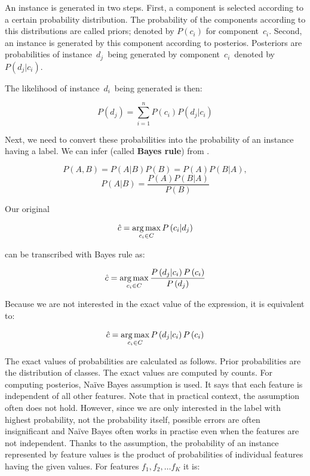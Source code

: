 An instance is generated in two steps.
First, a component is selected according to a certain probability distribution.
The probability of the components according to this distributions are
called priors; denoted by $P\left(c_i\right)$ for component~$c_i$.
Second, an instance is generated by this component according to posterios.
Posteriors are probabilities of instance~$d_j$~being generated by component~$c_i$~denoted by~$P\left(d_j|c_i\right)$.

The likelihood of instance~$d_i$~being generated is then:

\begin{equation}
	P\left(d_j\right) = \sum_{i=1}^{n}{
	P\left(c_i\right)
	P\left(d_j|c_i\right)
}
\end{equation}

Next, we need to convert these probabilities into the probability of an instance having a label.
We can infer  (called \textbf{Bayes rule}) from .

\begin{equation}
	\label{eq:bayesinfer}
	P\left(A,B\right) = 
	P\left(A|B\right)
	P\left(B\right) = 
	P\left(A\right)
	P\left(B|A\right),
\end{equation}
\begin{equation}
	\label{eq:bayesrule}
	P\left(A|B\right) =
	\frac{
	P\left(A\right)
P\left(B|A\right)}
{P\left(B\right)}
\end{equation}

Our original 

\begin{equation}
	\hat{c} = \operatorname*{arg\,max}_{c_i \in C} P\left(c_i  | d_j \right)
\end{equation}

can be transcribed with Bayes rule as:

\begin{equation}
	\hat{c} = \operatorname*{arg\,max}_{c_i \in C}
	\frac{
	P\left(d_j  | c_i \right)
	P\left( c_i \right)
}{
	P\left( d_j \right)
}
\end{equation}

Because we are not interested in the exact value of the expression, it is equivalent to:

\begin{equation}
	\label{eq:classprb}
	\hat{c} = \operatorname*{arg\,max}_{c_i \in C}
	P\left(d_j  | c_i \right)
	P\left( c_i \right)
\end{equation}

The exact values of probabilities are calculated as follows.
Prior probabilities are the distribution of classes.
The exact values are computed by counts.
For computing posterios, Na\"{i}ve Bayes assumption is used.
It says that each feature is independent of all other features.
Note that in practical context, the assumption often does not hold.
However, since we are only interested in the label with highest probability,
not the probability itself, possible errors are often insignificant and Na\"{i}ve Bayes often works in practise even when the features are not independent.
Thanks to the assumption, the probability of an instance represented by feature values is the product
of probabilities of individual features having the given values.
For features $f_1, f_2, \dots f_K$ it is:

